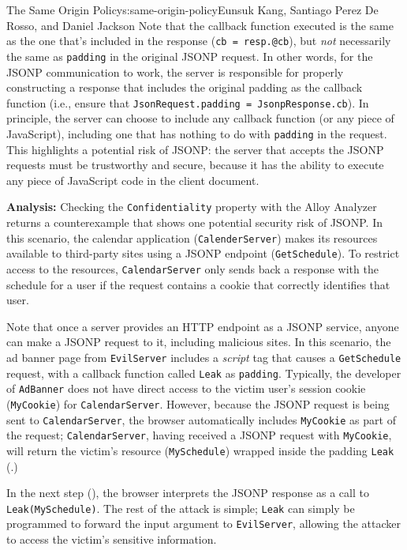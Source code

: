 \begin{aosachapter}{The Same Origin Policy}{s:same-origin-policy}{Eunsuk Kang, Santiago Perez De Rosso, and Daniel Jackson}
Note that the callback function executed is the same as the one that's
included in the response (\texttt{cb = resp.@cb}), but \emph{not}
necessarily the same as \texttt{padding} in the original JSONP request.
In other words, for the JSONP communication to work, the server is
responsible for properly constructing a response that includes the
original padding as the callback function (i.e., ensure that
\texttt{JsonRequest.padding = JsonpResponse.cb}). In principle, the
server can choose to include any callback function (or any piece of
JavaScript), including one that has nothing to do with \texttt{padding}
in the request. This highlights a potential risk of JSONP: the server
that accepts the JSONP requests must be trustworthy and secure, because
it has the ability to execute any piece of JavaScript code in the client
document.

\textbf{Analysis:} Checking the \texttt{Confidentiality} property with
the Alloy Analyzer returns a counterexample that shows one potential
security risk of JSONP. In this scenario, the calendar application
(\texttt{CalenderServer}) makes its resources available to third-party
sites using a JSONP endpoint (\texttt{GetSchedule}). To restrict access
to the resources, \texttt{CalendarServer} only sends back a response
with the schedule for a user if the request contains a cookie that
correctly identifies that user.

Note that once a server provides an HTTP endpoint as a JSONP service,
anyone can make a JSONP request to it, including malicious sites. In
this scenario, the ad banner page from \texttt{EvilServer} includes a
\emph{script} tag that causes a \texttt{GetSchedule} request, with a
callback function called \texttt{Leak} as \texttt{padding}. Typically,
the developer of \texttt{AdBanner} does not have direct access to the
victim user's session cookie (\texttt{MyCookie}) for
\texttt{CalendarServer}. However, because the JSONP request is being
sent to \texttt{CalendarServer}, the browser automatically includes
\texttt{MyCookie} as part of the request; \texttt{CalendarServer},
having received a JSONP request with \texttt{MyCookie}, will return the
victim's resource (\texttt{MySchedule}) wrapped inside the padding
\texttt{Leak} (.)


In the next step (), the
browser interprets the JSONP response as a call to
\texttt{Leak(MySchedule)}. The rest of the attack is simple;
\texttt{Leak} can simply be programmed to forward the input argument to
\texttt{EvilServer}, allowing the attacker to access the victim's
sensitive information.


\end{aosachapter}
